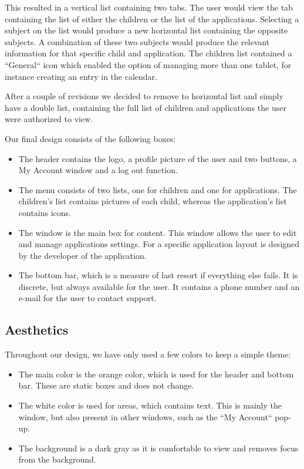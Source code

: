 This resulted in a vertical list containing two tabs. The user would view the tab containing the list of either the children or the list of the applications. Selecting a subject on the list would produce a new horizontal list containing the opposite subjects. A combination of these two subjects would produce the relevant information for that specific child and application.
The children list contained a ``General`` icon which enabled the option of managing more than one tablet, for instance creating an entry in the calendar. 


After a couple of revisions we decided to remove to horizontal list and simply have a double list, containing the full list of children and applications the user were authorized to view. 


Our final design consists of the following boxes:
\begin{itemize}
 \item The header contains the logo, a profile picture of the user and two buttons, a My Account window and a log out function.
 \item The menu consists of two lists, one for children and one for applications. The children's list contains pictures of each child, whereas the application's list contains icons. 
 \item The window is the main box for content. This window allows the user to edit and manage applications settings. For a specific application layout is designed by the developer of the application.
 \item The bottom bar, which is a measure of last resort if everything else fails. It is discrete, but always available for the user. It contains a phone number and an e-mail for the user to contact support.
\end{itemize}


\subsection{Aesthetics}
Throughout our design, we have only used a few colors to keep a simple theme:
\begin{itemize}
 \item The main color is the orange color, which is used for the header and bottom bar. These are static boxes and does not change.
 \item The white color is used for areas, which contains text. This is mainly the window, but also present in other windows, such as the ``My Account`` pop-up.
 \item The background is a dark gray as it is comfortable to view and removes focus from the background. 
\end{itemize}

